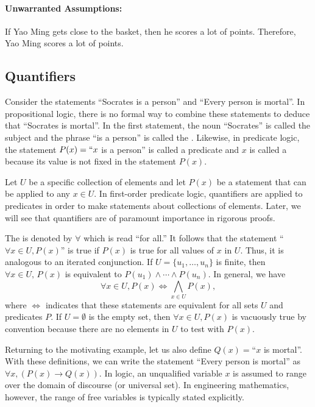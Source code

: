 \paragraph{Unwarranted Assumptions:}
If Yao Ming gets close to the basket, then he scores a lot of points.
Therefore, Yao Ming scores a lot of points.


\subsection{Quantifiers}\label{subsection:Quantifiers}

Consider the statements ``Socrates is a person'' and ``Every person is mortal''.
In propositional logic, there is no formal way to combine these statements to deduce that ``Socrates is mortal''.
In the first statement, the noun ``Socrates'' is called the subject and the phrase ``is a person'' is called the .
Likewise, in predicate logic, the statement $P(x)=``x$ is a person'' is called a predicate and $x$ is called a  because its value is not fixed in the statement $P(x)$.

Let $U$ be a specific collection of elements and let $P(x)$ be a statement that can be applied to any $x\in U$.
In first-order predicate logic, quantifiers are applied to predicates in order to make statements about collections of elements.
Later, we will see that quantifiers are of paramount importance in rigorous proofs.

The  is denoted by $\forall$ which is read ``for all.''
It follows that the statement ``$\forall x \in U, P(x)$'' is true if $P(x)$ is true for all values of $x$ in $U$.
Thus, it is analogous to an iterated conjunction.
If $U=\{u_1,\ldots,u_n\}$ is finite, then $\forall x\in U,\,P(x)$ is equivalent to $P(u_1)\wedge\cdots\wedge P(u_n)$.
In general, we have
\[ \forall x \in U, P(x) \Leftrightarrow \bigwedge_{x\in U} P(x), \]
where $\Leftrightarrow$ indicates that these statements are equivalent for all sets $U$ and predicates $P$.
If $U=\emptyset$ is the empty set, then $\forall x \in U, P(x)$ is vacuously true by convention because there are no elements in $U$ to test with $P(x)$.

Returning to the motivating example, let us also define $Q(x)=$``$x$ is mortal''.
With these definitions, we can write the statement ``Every person is mortal'' as $\forall x, ( P(x) \to Q(x) )$.
In logic, an unqualified variable $x$ is assumed to range over the domain of discourse (or universal set).
In engineering mathematics, however, the range of free variables is typically stated explicitly.
 

